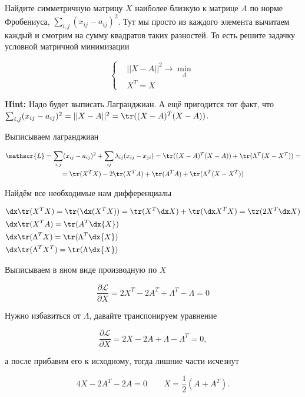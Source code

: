 \begin{problem}{}
	Найдите симметричную матрицу $X$ наиболее близкую к матрице $A$ по норме Фробениуса, $\sum_{i,j} (x_{ij} - a_{ij})^2$. Тут мы просто из каждого элемента вычитаем каждый и смотрим на сумму квадратов таких разностей. То есть решите задачку условной матричной минимизации 
	
	\begin{equation*}
	\begin{cases}
	& ||X - A||^2 \to \min_{A}  \\
	& X^T = X
	\end{cases}
	\end{equation*}
	
	\textbf{Hint:} Надо будет выписать Лагранджиан.  А ещё пригодится тот факт, что $\sum_{i,j} (x_{ij} - a_{ij})^2 = ||X-A||^2 =  \tr((X-A)^T (X-A))$.
\end{problem}

\begin{sol} 
Выписываем лагранджиан

\begin{multline*}
\mathscr{L} = \sum_{i,j} (x_{ij} - a_{ij})^2 + \sum_{ij} \lambda_{ij} (x_{ij} - x_{ji}) = \tr((X-A)^T (X-A)) + \tr(\Lambda^T (X - X^T)) = \\ = \tr(X^TX) - 2 \tr(X^TA) + \tr(A^TA) + \tr(\Lambda^T (X - X^T))
\end{multline*}

Найдём все необходимые нам дифференциалы

\begin{equation*}
    \begin{aligned} 
    & \dx \tr(X^TX) = \tr(\dx(X^TX))  = \tr(X^T\dx X) + \tr(\dx X^T X) = \tr(2 X^T\dx X) \\
    & \dx \tr(X^TA) = \tr(A^T \dx{X}) \\
    & \dx \tr(\Lambda^TX) = \tr(\Lambda^T \dx{X}) \\
    & \dx \tr(\Lambda^TX^T) = \tr(\Lambda \dx{X}) \\
    \end{aligned} 
\end{equation*}

Выписываем в яном виде производную по $X$ 

\[
\frac{\partial \mathscr{L}}{\partial X} = 2X^T - 2A^T + \Lambda^T - \Lambda = 0
\]

Нужно избавиться от $\Lambda$, давайте транспонируем уравнение

\[
\frac{\partial \mathscr{L}}{\partial X} = 2X - 2A + \Lambda - \Lambda^T = 0,
\]

а после прибавим его к исходному, тогда лишние части исчезнут 

\[
4X - 2A^T - 2A = 0 \qquad X = \frac{1}{2}(A + A^T).
\]
\end{sol} 

